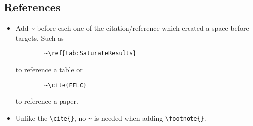 \documentclass[acmsmall,screen,review]{acmart}
\begin{document}
\subsection{References}
\begin{itemize}
    \item Add \textasciitilde{ } before each one of the citation/reference which created a space before targets. Such as
    \begin{verbatim}
        ~\ref{tab:SaturateResults}
    \end{verbatim}
    \vspace{-\baselineskip}
    to reference a table or
    \begin{verbatim}
        ~\cite{FFLC}
    \end{verbatim}
    \vspace{-\baselineskip}
    to reference a paper.
    \item Unlike the \verb+\cite{}+, no \verb+~+ is needed when adding \verb+\footnote{}+.
\end{itemize}
\end{document}
